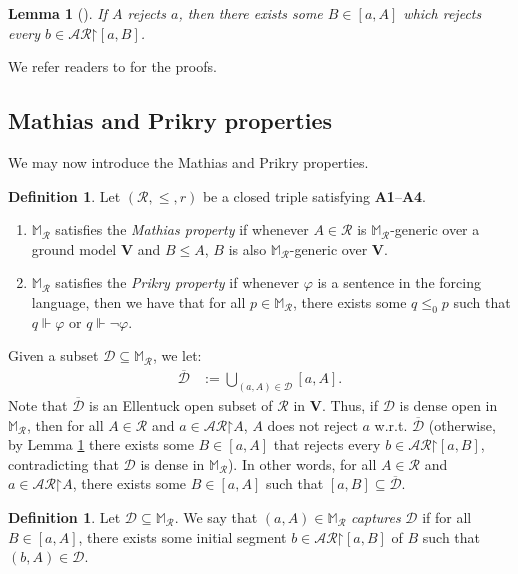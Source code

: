 \documentclass[11pt,reqno]{amsart}
\theoremstyle{plain}
\numberwithin{equation}{section}
\newtheorem{lemma}[theorem]{Lemma}
\theoremstyle{definition}
\newtheorem{definition}[theorem]{Definition}
\renewcommand{\bar}[1]{\overline{#1}}
\newcommand{\cal}{\mathcal}
\renewcommand{\bf}{\mathbf}
\newcommand{\forces}{\Vdash}
\newcommand{\restrictedto}{\mathord{\upharpoonright}}
\newcommand{\V}{\bf{V}}
\newcommand{\D}{\cal{D}}
\DeclareRobustCommand{\S}{\ifmmode\mathcal{S}\else\Sec\fi}
\begin{document}
\begin{lemma}[{\cite[Lemma 4.35]{T10}}]
\label{lem:completely.reject.reduction}
    If $A$ rejects $a$, then there exists some $B \in [a,A]$ which rejects every $b \in \cal{AR}\restrictedto[a,B]$.
\end{lemma}

We refer readers to \cite[\S4]{T10} for the proofs.

\subsection{Mathias and Prikry properties}
We may now introduce the Mathias and Prikry properties.

\begin{definition}
    Let $(\cal{R},\leq,r)$ be a closed triple satisfying \textbf{A1}--\textbf{A4}.
    \begin{enumerate}
        \item $\mathbb{M}_\cal{R}$ satisfies the \emph{Mathias property} if whenever $A \in \cal{R}$ is $\mathbb{M}_\cal{R}$-generic over a ground model $\V$ and $B \leq A$, $B$ is also $\mathbb{M}_\cal{R}$-generic over $\V$.

        \item $\mathbb{M}_\cal{R}$ satisfies the \emph{Prikry property} if whenever $\varphi$ is a sentence in the forcing language, then we have that for all $p \in \mathbb{M}_\cal{R}$, there exists some $q \leq_0 p$ such that $q \forces \varphi$ or $q \forces \neg\varphi$.
    \end{enumerate}
\end{definition}

Given a subset $\D \subseteq \mathbb{M}_\cal{R}$, we let:
\begin{align*}
    \bar{\D} &:= \bigcup_{(a,A) \in \D} [a,A].
\end{align*}
Note that $\bar{\D}$ is an Ellentuck open subset of $\cal{R}$ in $\V$. Thus, if $\D$ is dense open in $\mathbb{M}_\cal{R}$, then for all $A \in \cal{R}$ and $a \in \cal{AR}\restrictedto A$, $A$ does not reject $a$ w.r.t. $\bar{\D}$ (otherwise, by Lemma \ref{lem:completely.reject.reduction} there exists some $B \in [a,A]$ that rejects every $b \in \cal{AR}\restrictedto[a,B]$, contradicting that $\D$ is dense in $\mathbb{M}_\cal{R}$). In other words, for all $A \in \cal{R}$ and $a \in \cal{AR}\restrictedto A$, there exists some $B \in [a,A]$ such that $[a,B] \subseteq \bar{\D}$.

\begin{definition}
\label{def:capture}
    Let $\D \subseteq \mathbb{M}_\cal{R}$. We say that $(a,A) \in \mathbb{M}_\cal{R}$ \emph{captures} $\D$ if for all $B \in [a,A]$, there exists some initial segment $b \in \cal{AR}\restrictedto[a,B]$ of $B$ such that $(b,A) \in \D$.
\end{definition}
\end{document}
